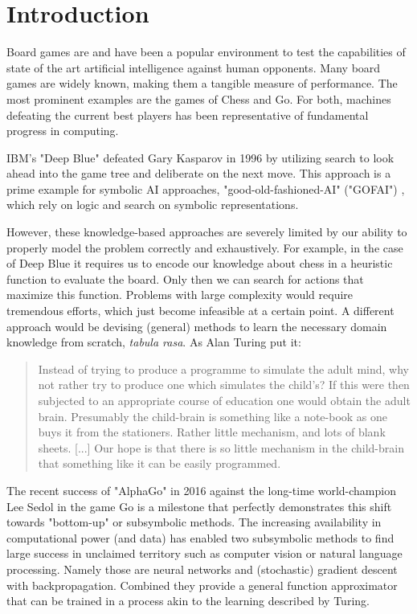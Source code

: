 \chapter{Introduction}

Board games are and have been a popular environment to test the capabilities of state of the art artificial intelligence against human opponents. Many board games are widely known, making them a tangible measure of performance. The most prominent examples are the games of Chess and Go. For both, machines defeating the current best players has been representative of fundamental progress in computing.

IBM's "Deep Blue" defeated Gary Kasparov in 1996 \cite{higgins_brief_2017} by utilizing search to look ahead into the game tree and deliberate on the next move. This approach is a prime example for symbolic AI approaches, "good-old-fashioned-AI" ("GOFAI") \cite{haugeland_artificial_1985}, which rely on logic and search on symbolic representations.

However, these knowledge-based approaches are severely limited by our ability to properly model the problem correctly and exhaustively. For example, in the case of Deep Blue it requires us to encode our knowledge about chess in a heuristic function to evaluate the board. Only then we can search for actions that maximize this function. Problems with large complexity would require tremendous efforts, which just become infeasible at a certain point. A different approach would be devising (general) methods to learn the necessary domain knowledge from scratch,  \emph{tabula rasa}. As Alan Turing put it:

\begin{quote}
    Instead of trying to produce a programme to simulate the adult mind, why not rather try to produce one which simulates the child’s? If this were then subjected to an appropriate course of education one would obtain the adult brain. Presumably the child-brain is something like a note-book as one buys it from the stationers. Rather little mechanism, and lots of blank sheets. [...] Our hope is that there is so little mechanism in the child-brain that something like it can be easily programmed.
    \cite{turing_icomputing_1950}
\end{quote}

The recent success of "AlphaGo" in 2016 against the long-time world-champion Lee Sedol \cite{deepmind_match_nodate} in the game Go is a milestone that perfectly demonstrates this shift towards "bottom-up" or subsymbolic methods. \cite{nilsson_artificial_1998} The increasing availability in computational power (and data) has enabled two subsymbolic methods to find large success in unclaimed territory such as computer vision or natural language processing. Namely those are neural networks and (stochastic) gradient descent with backpropagation. Combined they provide a general function approximator that can be trained in a process akin to the learning described by Turing.

